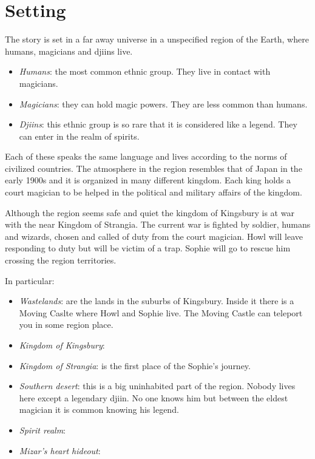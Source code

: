 \section{Setting}
The story is set in a far away universe in a unspecified region of the Earth, where humans, magicians and djiins live.
\begin{itemize}
\item \textit{Humans}: the most common ethnic group. They live in contact with magicians. 
\item \textit{Magicians}: they can hold magic powers. They are less common than humans.
\item \textit{Djiins}: this ethnic group is so rare that it is considered like a legend. They can enter in the realm of spirits.
\end{itemize}
Each of these speaks the same language and lives according to the norms of civilized countries.
The atmosphere in the region resembles that of Japan in the early 1900s and it is organized in many different kingdom.
Each king holds a court magician to be helped in the political and military affairs of the kingdom.

Although the region seems safe and quiet the kingdom of Kingsbury is at war with the near Kingdom of Strangia.
The current war is fighted by soldier, humans and wizards, chosen and called of duty from the court magician.
Howl will leave responding to duty but will be victim of a trap. Sophie will go to rescue him crossing the region territories.

In particular:
\begin{itemize}
\item \textit{Wastelands}:
  are the lands in the suburbs of Kingsbury. Inside it there is a Moving Caslte where Howl and Sophie live. The Moving Castle can teleport you in some region place.
\item \textit{Kingdom of Kingsbury}:  
\item \textit{Kingdom of Strangia}: is the first place of the Sophie's journey. 
\item \textit{Southern desert}: this is a big uninhabited part of the region. Nobody lives here except a legendary djiin. No one knows him but between the eldest magician it is common knowing his legend.
\item \textit{Spirit realm}:
\item \textit{Mizar’s heart hideout}:
\end{itemize}



